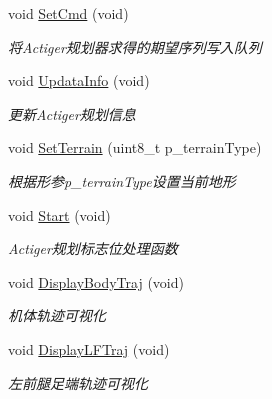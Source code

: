 \begin{DoxyCompactItemize}
void \hyperlink{classquadruped_1_1MotionPlan_a4aab89067581b6c44636eed8e71fb8c2}{Set\+Cmd} (void)
\begin{DoxyCompactList}\small\item\em 将\+Actiger规划器求得的期望序列写入队列 \end{DoxyCompactList}\item 
\mbox{\label{classquadruped_1_1MotionPlan_ac9ab5a55e108b3ca024a61de0402328a}} 
void \hyperlink{classquadruped_1_1MotionPlan_ac9ab5a55e108b3ca024a61de0402328a}{Updata\+Info} (void)
\begin{DoxyCompactList}\small\item\em 更新\+Actiger规划信息 \end{DoxyCompactList}\item 
void \hyperlink{classquadruped_1_1MotionPlan_a46f0f22ad97c07959a86eb055778455e}{Set\+Terrain} (uint8\+\_\+t p\+\_\+terrain\+Type)
\begin{DoxyCompactList}\small\item\em 根据形参p\+\_\+terrain\+Type设置当前地形 \end{DoxyCompactList}\item 
\mbox{\label{classquadruped_1_1MotionPlan_a67cb0a9de47d8692a7f771f53ded75d7}} 
void \hyperlink{classquadruped_1_1MotionPlan_a67cb0a9de47d8692a7f771f53ded75d7}{Start} (void)
\begin{DoxyCompactList}\small\item\em Actiger规划标志位处理函数 \end{DoxyCompactList}\item 
\mbox{\label{classquadruped_1_1MotionPlan_ace34ba5ac538bf888557f3ce018b13aa}} 
void \hyperlink{classquadruped_1_1MotionPlan_ace34ba5ac538bf888557f3ce018b13aa}{Display\+Body\+Traj} (void)
\begin{DoxyCompactList}\small\item\em 机体轨迹可视化 \end{DoxyCompactList}\item 
\mbox{\label{classquadruped_1_1MotionPlan_afdaeeb4026e7d7b1addf141ff6cc3eb3}} 
void \hyperlink{classquadruped_1_1MotionPlan_afdaeeb4026e7d7b1addf141ff6cc3eb3}{Display\+L\+F\+Traj} (void)
\begin{DoxyCompactList}\small\item\em 左前腿足端轨迹可视化 \end{DoxyCompactList}\item 

\end{DoxyCompactItemize}
